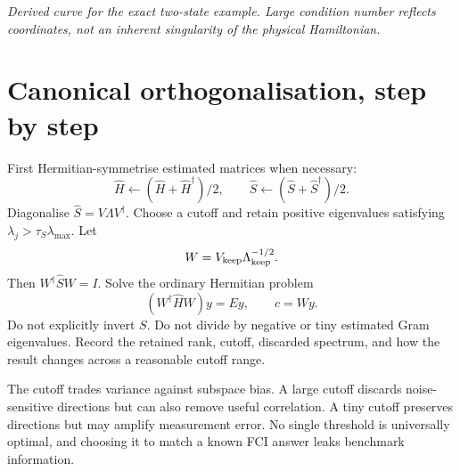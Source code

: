 \documentclass[11pt,a4paper,oneside]{report}
\begin{document}
\begin{center}
\end{center}
\textit{Derived curve for the exact two-state example. Large condition number reflects coordinates, not an inherent singularity of the physical Hamiltonian.}

\section{Canonical orthogonalisation, step by step}
First Hermitian-symmetrise estimated matrices when necessary:
\begin{equation}
\widehat H\leftarrow(\widehat H+\widehat H^\dagger)/2,\qquad
\widehat S\leftarrow(\widehat S+\widehat S^\dagger)/2.
\end{equation}
Diagonalise $\widehat S=V\Lambda V^\dagger$. Choose a cutoff and retain positive eigenvalues satisfying $\lambda_j>\tau_S\lambda_{\max}$. Let
\begin{equation}
W=V_{\rm keep}\Lambda_{\rm keep}^{-1/2}.
\end{equation}
Then $W^\dagger\widehat S W=I$. Solve the ordinary Hermitian problem
\begin{equation}
(W^\dagger\widehat H W)y=Ey,\qquad c=Wy.
\end{equation}
Do not explicitly invert $S$. Do not divide by negative or tiny estimated Gram eigenvalues. Record the retained rank, cutoff, discarded spectrum, and how the result changes across a reasonable cutoff range.

The cutoff trades variance against subspace bias. A large cutoff discards noise-sensitive directions but can also remove useful correlation. A tiny cutoff preserves directions but may amplify measurement error. No single threshold is universally optimal, and choosing it to match a known FCI answer leaks benchmark information.
\end{document}
